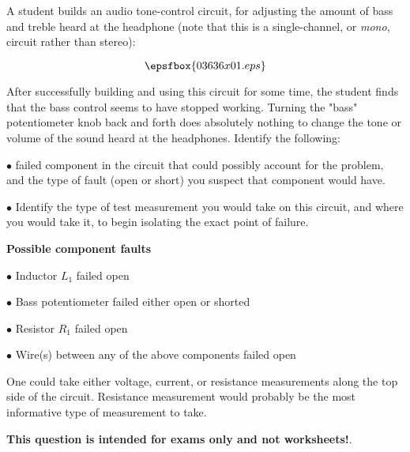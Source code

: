 

A student builds an audio tone-control circuit, for adjusting the amount of bass and treble heard at the headphone (note that this is a single-channel, or {\it mono}, circuit rather than stereo):

$$\epsfbox{03636x01.eps}$$

After successfully building and using this circuit for some time, the student finds that the bass control seems to have stopped working.  Turning the "bass" potentiometer knob back and forth does absolutely nothing to change the tone or volume of the sound heard at the headphones.  Identify the following:

\vskip 10pt

\medskip
\item{$\bullet$}  failed component in the circuit that could possibly account for the problem, and the type of fault (open or short) you suspect that component would have.
\vskip 40pt
\item{$\bullet$} Identify the type of test measurement you would take on this circuit, and where you would take it, to begin isolating the exact point of failure.
\medskip







\noindent
{\bf Possible component faults}

\medskip
\item{$\bullet$} Inductor $L_1$ failed open
\item{$\bullet$} Bass potentiometer failed either open or shorted
\item{$\bullet$} Resistor $R_1$ failed open
\item{$\bullet$} Wire(s) between any of the above components failed open
\medskip

One could take either voltage, current, or resistance measurements along the top side of the circuit.  Resistance measurement would probably be the most informative type of measurement to take.







{\bf This question is intended for exams only and not worksheets!}.



